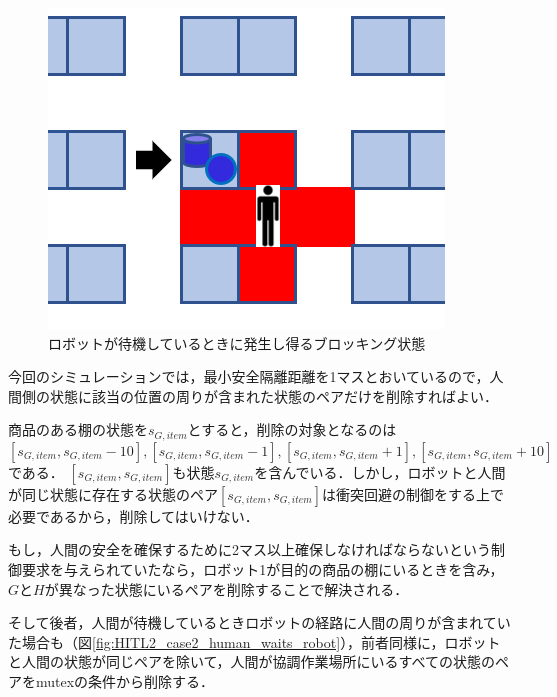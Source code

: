 \begin{figure}[!t]
    \centering
    \includegraphics[scale=0.3]{figures/HITL2_case2_robot_waits_human.png}
    \caption{ロボットが待機しているときに発生し得るブロッキング状態}
    \label{fig:HITL2_case2_robot_waits_human}
\end{figure}


今回のシミュレーションでは，最小安全隔離距離を1マスとおいているので，人間側の状態に該当の位置の周りが含まれた状態のペアだけを削除すればよい．

商品のある棚の状態を$s_{G,item}$とすると，削除の対象となるのは$[s_{G,item},s_{G,item}-10], [s_{G,item},s_{G,item}-1], [s_{G,item},s_{G,item}+1], [s_{G,item},s_{G,item}+10]$である．
$[s_{G,item},s_{G,item}]$も状態$s_{G,item}$を含んでいる．しかし，ロボットと人間が同じ状態に存在する状態のペア$[s_{G,item},s_{G,item}]$は衝突回避の制御をする上で必要であるから，削除してはいけない．

もし，人間の安全を確保するために2マス以上確保しなければならないという制御要求を与えられていたなら，ロボット1が目的の商品の棚にいるときを含み，$G$と$H$が異なった状態にいるペアを削除することで解決される．

そして後者，人間が待機しているときロボットの経路に人間の周りが含まれていた場合も（図\ref{fig:HITL2_case2_human_waits_robot}），前者同様に，ロボットと人間の状態が同じペアを除いて，人間が協調作業場所にいるすべての状態のペアをmutexの条件から削除する．

